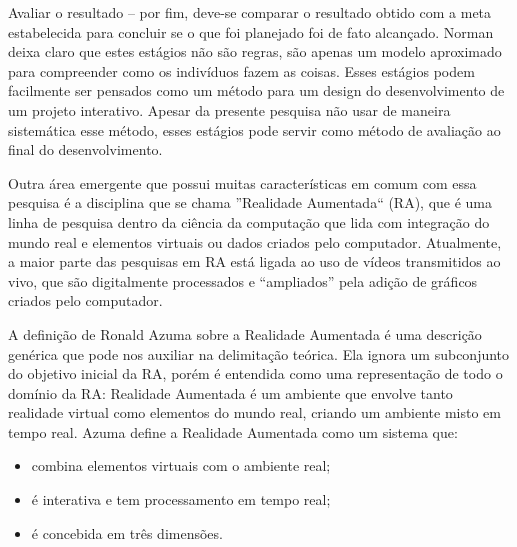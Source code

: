 \documentclass[draft]{ppgmus}
\begin{document}
Avaliar o resultado – por fim, deve-se comparar o resultado
obtido com a meta estabelecida para concluir se o que foi
planejado foi de fato alcançado.
Norman deixa claro que estes estágios não são regras,
são apenas um modelo aproximado para compreender como
os indivíduos fazem as coisas. Esses estágios podem facilmente
ser pensados como um método para um design do desenvolvimento 
de um projeto interativo. Apesar da presente pesquisa não usar de 
maneira sistemática esse método, esses estágios pode servir como
método de avaliação ao final do desenvolvimento.

Outra área emergente que possui muitas características em comum com essa
pesquisa é a disciplina que se chama ''Realidade Aumentada`` (RA), que é uma linha de pesquisa dentro da ciência da computação que lida com 
integração do mundo real e elementos virtuais ou dados criados pelo computador. Atualmente, a 
maior parte das pesquisas em RA está ligada ao uso de vídeos transmitidos ao vivo, que são 
digitalmente processados e “ampliados” pela adição de gráficos criados pelo computador.

A definição de Ronald Azuma 
sobre a Realidade Aumentada \cite{azuma97:ar} é uma descrição genérica que pode nos auxiliar na delimitação teórica. 
Ela ignora um subconjunto do objetivo inicial da RA, porém é entendida como uma representação 
de todo o domínio da RA: Realidade Aumentada é um ambiente que envolve tanto realidade virtual 
como elementos do mundo real, criando um ambiente misto em tempo real.
Azuma define a Realidade Aumentada como um sistema que:
\begin{itemize}
 \item combina elementos virtuais com o ambiente real; 
  \item é interativa e tem processamento em tempo real; 
  \item  é concebida em três dimensões.
\end{itemize}
\end{document}

